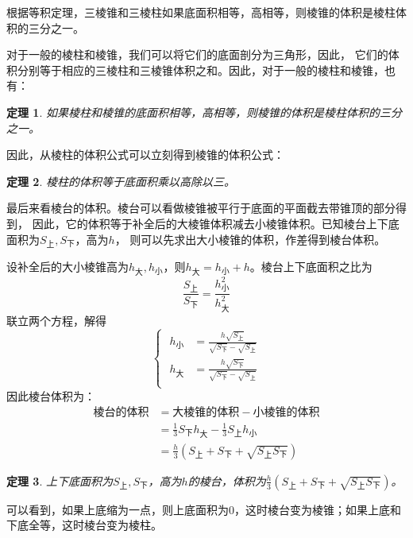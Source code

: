 \documentclass[12pt,UTF8]{ctexbook}
\newtheorem{tm}{定理}[section]
\newtheorem{sk}{思考}[section]
\begin{document}
根据等积定理，三棱锥和三棱柱如果底面积相等，高相等，则棱锥的体积是棱柱体积的三分之一。

对于一般的棱柱和棱锥，我们可以将它们的底面剖分为三角形，因此，
它们的体积分别等于相应的三棱柱和三棱锥体积之和。因此，对于一般的棱柱和棱锥，也有：
\begin{tm}\label{tm:3-2-20}
    如果棱柱和棱锥的底面积相等，高相等，则棱锥的体积是棱柱体积的三分之一。
\end{tm}
因此，从棱柱的体积公式可以立刻得到棱锥的体积公式：
\begin{tm}\label{tm:3-2-30}
    棱柱的体积等于底面积乘以高除以三。
\end{tm}

最后来看棱台的体积。棱台可以看做棱锥被平行于底面的平面截去带锥顶的部分得到，
因此，它的体积等于补全后的大棱锥体积减去小棱锥体积。已知棱台上下底面积为$S_{\text{上}},S_{\text{下}}$，高为$h$，
则可以先求出大小棱锥的体积，作差得到棱台体积。

设补全后的大小棱锥高为$h_{\text{大}},h_{\text{小}}$，则$h_{\text{大}} = h_{\text{小}} + h$。棱台上下底面积之比为
$$ \frac{S_{\text{上}}}{S_{\text{下}}} = \frac{h_{\text{小}}^2}{h_{\text{大}}^2} $$
联立两个方程，解得
$$ 
    \left\{\,\,
    \begin{array}{cl}
        h_{\text{小}} &= \frac{h\sqrt{S_{\text{上}}}}{\sqrt{S_{\text{下}}} - \sqrt{S_{\text{上}}}} \\
        h_{\text{大}} &= \frac{h\sqrt{S_{\text{下}}}}{\sqrt{S_{\text{下}}} - \sqrt{S_{\text{上}}}} \\
    \end{array}
    \right.
$$
因此棱台体积为：
\begin{align*}
    \text{棱台的体积} &= \text{大棱锥的体积} - \text{小棱锥的体积}  \\
    &= \frac{1}{3}S_{\text{下}}h_{\text{大}} - \frac{1}{3}S_{\text{上}}h_{\text{小}} \\
    &= \frac{h}{3}\left(S_{\text{上}} + S_{\text{下}} + \sqrt{S_{\text{上}}S_{\text{下}}}\right) 
\end{align*}
\begin{tm}\label{tm:3-2-40}
    上下底面积为$S_{\text{上}},S_{\text{下}}$，高为$h$的棱台，体积为$\frac{h}{3}\left(S_{\text{上}} + S_{\text{下}} + \sqrt{S_{\text{上}}S_{\text{下}}}\right)$。
\end{tm}
可以看到，如果上底缩为一点，则上底面积为$0$，这时棱台变为棱锥；如果上底和下底全等，这时棱台变为棱柱。
\end{document}
